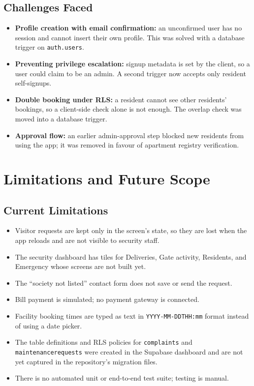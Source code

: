 \documentclass{tietreport}
\renewcommand{\_}{\textunderscore\allowbreak}
\begin{document}
\subsection{Challenges Faced}

\begin{itemize}
  \item \textbf{Profile creation with email confirmation:} an unconfirmed
  user has no session and cannot insert their own profile. This was solved
  with a database trigger on \texttt{auth.users}.
  \item \textbf{Preventing privilege escalation:} signup metadata is set by
  the client, so a user could claim to be an admin. A second trigger now
  accepts only resident self-signups.
  \item \textbf{Double booking under RLS:} a resident cannot see other
  residents' bookings, so a client-side check alone is not enough. The
  overlap check was moved into a database trigger.
  \item \textbf{Approval flow:} an earlier admin-approval step blocked new
  residents from using the app; it was removed in favour of apartment
  registry verification.
\end{itemize}


\section{Limitations and Future Scope}
\label{sec:future}

\subsection{Current Limitations}

\begin{itemize}
  \item Visitor requests are kept only in the screen's state, so they are
  lost when the app reloads and are not visible to security staff.
  \item The security dashboard has tiles for Deliveries, Gate activity,
  Residents, and Emergency whose screens are not built yet.
  \item The ``society not listed'' contact form does not save or send the
  request.
  \item Bill payment is simulated; no payment gateway is connected.
  \item Facility booking times are typed as text in
  \texttt{YYYY-MM-DDTHH:mm} format instead of using a date picker.
  \item The table definitions and RLS policies for \texttt{complaints} and
  \texttt{maintenance\_requests} were created in the Supabase dashboard and
  are not yet captured in the repository's migration files.
  \item There is no automated unit or end-to-end test suite; testing is
  manual.
\end{itemize}
\end{document}
